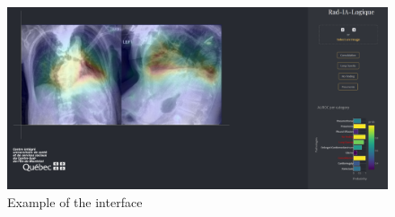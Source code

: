 \documentclass[11pt]{article}
\begin{document}
            \begin{landscape}
            \begin{figure}
                \centering
                \includegraphics[width=\linewidth]{plots/webapp}
                \caption{Example of the interface}
                \label{fig:interface}
            \end{figure}
            \end{landscape}
    \newpage
    {
    \small

    \printbibliography
    }
\end{document}
